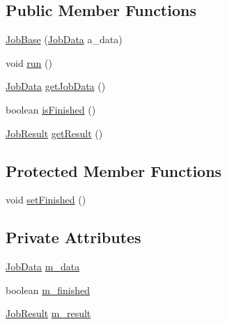 \subsection*{Public Member Functions}
\begin{DoxyCompactItemize}
\item 
\hyperlink{classorg_1_1jgap_1_1impl_1_1job_1_1_job_base_a0171f580a776023f9b6e5c191b9139c0}{Job\-Base} (\hyperlink{classorg_1_1jgap_1_1impl_1_1job_1_1_job_data}{Job\-Data} a\-\_\-data)
\item 
void \hyperlink{classorg_1_1jgap_1_1impl_1_1job_1_1_job_base_a4395288c6b1143da26fc7edb5d2bc792}{run} ()
\item 
\hyperlink{classorg_1_1jgap_1_1impl_1_1job_1_1_job_data}{Job\-Data} \hyperlink{classorg_1_1jgap_1_1impl_1_1job_1_1_job_base_a95104e54e5fb2719a025cb95389d4805}{get\-Job\-Data} ()
\item 
boolean \hyperlink{classorg_1_1jgap_1_1impl_1_1job_1_1_job_base_a7a763c3c6874b7aff8f1643efc22fcf0}{is\-Finished} ()
\item 
\hyperlink{classorg_1_1jgap_1_1impl_1_1job_1_1_job_result}{Job\-Result} \hyperlink{classorg_1_1jgap_1_1impl_1_1job_1_1_job_base_ae5cacf4304620ad0b831db78a6323af2}{get\-Result} ()
\end{DoxyCompactItemize}
\subsection*{Protected Member Functions}
\begin{DoxyCompactItemize}
\item 
void \hyperlink{classorg_1_1jgap_1_1impl_1_1job_1_1_job_base_a19adec030ce5e064956cf93b849fe233}{set\-Finished} ()
\end{DoxyCompactItemize}
\subsection*{Private Attributes}
\begin{DoxyCompactItemize}
\item 
\hyperlink{classorg_1_1jgap_1_1impl_1_1job_1_1_job_data}{Job\-Data} \hyperlink{classorg_1_1jgap_1_1impl_1_1job_1_1_job_base_ac567f0af79ce7d13ea205374aa641a79}{m\-\_\-data}
\item 
boolean \hyperlink{classorg_1_1jgap_1_1impl_1_1job_1_1_job_base_aec532538d18dd97bde153384da60329d}{m\-\_\-finished}
\item 
\hyperlink{classorg_1_1jgap_1_1impl_1_1job_1_1_job_result}{Job\-Result} \hyperlink{classorg_1_1jgap_1_1impl_1_1job_1_1_job_base_af13593fce355fca220745c657ae6989e}{m\-\_\-result}
\end{DoxyCompactItemize}
